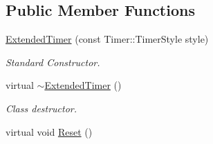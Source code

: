 \subsection*{Public Member Functions}
\begin{DoxyCompactItemize}
\item 
\hyperlink{classphys_1_1ExtendedTimer_a5dfd8368d6fa8b69ca8ab23b2d3ba69e}{ExtendedTimer} (const Timer::TimerStyle style)
\begin{DoxyCompactList}\small\item\em Standard Constructor. \item\end{DoxyCompactList}\item 
\hypertarget{classphys_1_1ExtendedTimer_a7a9ce42ffda17cbe366adde1688120af}{
virtual \hyperlink{classphys_1_1ExtendedTimer_a7a9ce42ffda17cbe366adde1688120af}{$\sim$ExtendedTimer} ()}
\label{dc/d7c/classphys_1_1ExtendedTimer_a7a9ce42ffda17cbe366adde1688120af}

\begin{DoxyCompactList}\small\item\em Class destructor. \item\end{DoxyCompactList}\item 
\hypertarget{classphys_1_1ExtendedTimer_a33f0cb87c37031ec54b99d09a522bafb}{
virtual void \hyperlink{classphys_1_1ExtendedTimer_a33f0cb87c37031ec54b99d09a522bafb}{Reset} ()}
\label{dc/d7c/classphys_1_1ExtendedTimer_a33f0cb87c37031ec54b99d09a522bafb}


\end{DoxyCompactItemize}
